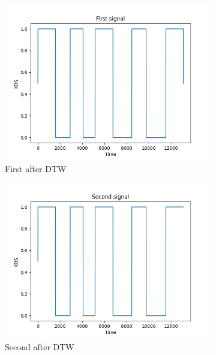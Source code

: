 \documentclass[10pt,a4paper]{report}
\begin{document}
\begin{figure}
	\centering
	\begin{subfigure}[b]{0.3\textwidth}
		\centering
		\includegraphics[width=\textwidth]{KDS1DTW}
		\caption{First after DTW}
		\label{fig:KDS1DTW}
	\end{subfigure}
	\hfill
	\begin{subfigure}[b]{0.3\textwidth}
		\centering
		\includegraphics[width=\textwidth]{KDS2DTW}
		\caption{Second after DTW}
		\label{fig:KDS2DTW}
	\end{subfigure}
	\hfill
	\begin{subfigure}[b]{0.3\textwidth}
		\centering

\end{subfigure}
\end{figure}
\end{document}
